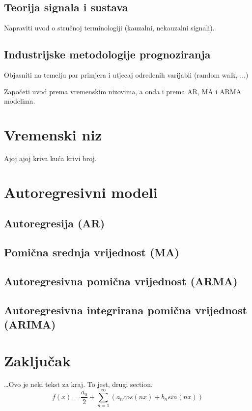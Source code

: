 \documentclass[a4paper,12pt,oneside]{memoir}
\newcommand{\fourierovred}{f(x)= \frac{a_0}{2}+\sum_{n=1}^\infty (a_n cos(nx)+b_n sin(nx))}
\begin{document}

        \section{Teorija signala i sustava}
            Napraviti uvod o stručnoj terminologiji (kauzalni, nekauzalni signali).
        \section{Industrijske metodologije prognoziranja}
            Objasniti na temelju par primjera i utjecaj određenih varijabli (random walk, ...)

            Započeti uvod prema vremenskim nizovima, a onda i prema AR, MA i ARMA modelima.
    \chapter{Vremenski niz}
        Ajoj ajoj kriva kuća krivi broj.
    \chapter{Autoregresivni modeli}
        \section{Autoregresija (AR)}
        \section{Pomična srednja vrijednost (MA)}
        \section{Autoregresivna pomična vrijednost (ARMA)}
        \section{Autoregresivna integrirana pomična vrijednost (ARIMA)}
    \chapter{Zaključak}
        \ldots{}Ovo je neki tekst za kraj. To jest, drugi section.
        $$\fourierovred$$
\end{document}
